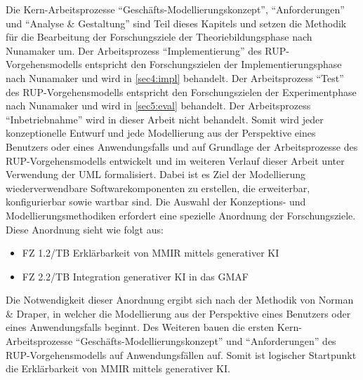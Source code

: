 Die Kern-Arbeitsprozesse \enquote{Geschäfts-Modellierungskonzept}, \enquote{Anforderungen} und \enquote{Analyse \& Gestaltung} sind Teil dieses Kapitels und setzen die Methodik für die Bearbeitung der Forschungsziele der Theoriebildungsphase nach Nunamaker um.
Der Arbeitsprozess \enquote{Implementierung} des RUP-Vorgehensmodells entspricht den Forschungszielen der Implementierungsphase nach Nunamaker und wird in \cref{sec4:impl} behandelt.
Der Arbeitsprozess \enquote{Test} des RUP-Vorgehensmodells entspricht den Forschungszielen der Experimentphase nach Nunamaker und wird in \cref{sec5:eval} behandelt. Der Arbeitsprozess \enquote{Inbetriebnahme} wird in dieser Arbeit nicht behandelt. Somit wird jeder konzeptionelle Entwurf und jede Modellierung aus der Perspektive eines Benutzers oder eines Anwendungsfalls und auf Grundlage der Arbeitsprozesse des RUP-Vorgehensmodells entwickelt und im weiteren Verlauf dieser Arbeit unter Verwendung der UML formalisiert. Dabei
ist es Ziel der Modellierung wiederverwendbare Softwarekomponenten zu erstellen, die erweiterbar, konfigurierbar sowie wartbar sind. Die Auswahl der Konzeptions- und Modellierungsmethodiken erfordert eine spezielle Anordnung der Forschungsziele. Diese Anordnung sieht wie folgt aus:
\begin{itemize}
    \item FZ 1.2/TB Erklärbarkeit von MMIR mittels generativer KI
    \item FZ 2.2/TB Integration generativer KI in das GMAF
\end{itemize}
Die Notwendigkeit dieser Anordnung ergibt sich nach der Methodik von Norman \& Draper, in welcher die Modellierung aus der Perspektive eines Benutzers oder eines Anwendungsfalls beginnt. Des Weiteren bauen die ersten Kern-Arbeitsprozesse \enquote{Geschäfts-Modellierungskonzept} und \enquote{Anforderungen} des RUP-Vorgehensmodells auf Anwendungsfällen auf. Somit ist logischer Startpunkt die Erklärbarkeit von MMIR mittels generativer KI.

\FloatBarrier

